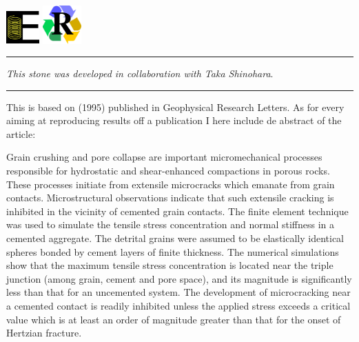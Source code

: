 
\includegraphics[height=1.25cm]{images/pictograms/elasticity}
\includegraphics[width=1.5cm]{images/pictograms/replication}



\par\noindent\rule{\textwidth}{0.4pt}

{\sl This stone was developed in collaboration with Taka Shinohara}.

\par\noindent\rule{\textwidth}{0.4pt}


This \stone is based on \textcite{wowu95} (1995) published in Geophysical Research Letters. 
As for every \stone aiming at reproducing results off a publication I here include de abstract
of the article:

\begin{center}
\begin{minipage}{13cm}
{\small 
Grain crushing and pore collapse are important micromechanical processes responsible for hydrostatic and 
shear-enhanced compactions in porous rocks. These processes initiate from extensile microcracks which 
emanate from grain contacts. Microstructural observations indicate that such extensile cracking is inhibited 
in the vicinity of cemented grain contacts. The finite element technique was used to simulate the tensile 
stress concentration and normal stiffness in a cemented aggregate. The detrital grains were assumed to 
be elastically identical spheres bonded by cement layers of finite thickness. The numerical simulations 
show that the maximum tensile stress concentration is located near the triple junction (among grain, 
cement and pore space), and its magnitude is significantly less than that for an uncemented system. 
The development of microcracking near a cemented contact is readily inhibited unless the applied 
stress exceeds a critical value which is at least an order of magnitude greater than that for the 
onset of Hertzian fracture.
}
\end{minipage}
\end{center}

